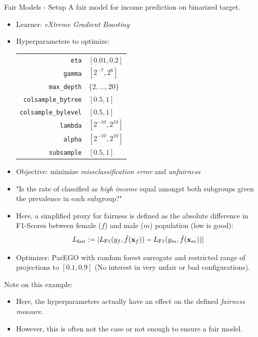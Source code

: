 \begin{frame}[allowframebreaks]{Fair Models - Setup}
  A fair model for income prediction on binarized target.
\begin{itemize}
  \item Learner: \emph{eXtreme Gradient Boosting}
  \item Hyperparameters to optimize: \\
  \begin{tabular}{rl}
    \texttt{eta} & $[0.01,0.2]$ \\
    \texttt{gamma} & $[2^{-7},2^6]$ \\
    \texttt{max\_depth} & $\{2, \ldots, 20\}$ \\
    \texttt{colsample\_bytree} & $[0.5,1]$ \\
    \texttt{colsample\_bylevel} & $[0.5,1]$ \\
    \texttt{lambda} & $[2^{-10},2^{10}]$ \\
    \texttt{alpha} & $[2^{-10},2^{10}]$ \\
    \texttt{subsample} & $[0.5,1]$ \\
  \end{tabular}
  \item Objective: minimize \emph{missclassification error} and \emph{unfairness}
  \item "Is the rate of classified as \emph{high income} equal amongst both subgroups given the prevalence in each subgroup?"
  \item Here, a simplified proxy for fairness is defined as the absolute difference in F1-Scores between female ($f$) and male ($m$) population (low is good):
  \[
  L_{\text{fair}} := |L_{\text{F1}}(y_f,\hat{f}(\mathbf{x}_f)) - L_{\text{F1}}(y_m,\hat{f}(\mathbf{x}_m))|
  \]
  \item Optimizer: ParEGO with random forest surrogate and restricted range of projections to $[0.1, 0.9]$ (No interest in very unfair or bad configurations).
\end{itemize}
\vspace{1em}
Note on this example:
\begin{itemize}
  \item Here, the hyperparameters actually have an effect on the defined \emph{fairness measure}.
  \item However, this is often not the case or not enough to ensure a fair model.
\end{itemize}

\end{frame}

